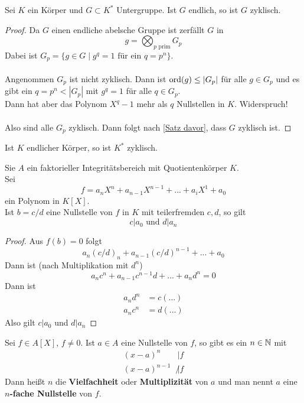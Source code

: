 	\begin{theorem}
		Sei $K$ ein Körper und $G\subset K^*$ Untergruppe. Ist $G$ endlich, so ist $G$ zyklisch.
	\end{theorem}
	\begin{proof}
		Da $G$ einen endliche abelsche Gruppe ist zerfällt $G$ in
		\[g=\bigotimes_{\text{$p$ prim}}G_p\]
		Dabei ist $G_p=\{g\in G\mid \text{$g^q=1$ für ein $q=p^n$}\}$.\\
		\\
		Angenommen $G_p$ ist nicht zyklisch. Dann ist $\operatorname{ord}(g)\leq |G_p|$ für alle $g\in G_p$ und es gibt ein $q=p^n<|G_p|$ mit $g^q=1$ für alle $q\in G_p$.\\
		Dann hat aber das Polynom $X^q-1$ mehr als $q$ Nullstellen in $K$. Widerspruch!\\
		\\
		Also sind alle $G_p$ zyklisch. Dann folgt nach \ref{Satz davor}, dass $G$ zyklisch ist.
	\end{proof}

	\begin{kor}
		Ist $K$ endlicher Körper, so ist $K^*$ zyklisch.
	\end{kor}

	\begin{satz}
		Sie $A$ ein faktorieller Integritätsbereich mit Quotientenkörper $K$.\\
		Sei
		\[f=a_nX^n+a_{n-1}X^{n-1}+...+a_iX^1+a_0\]
		ein Polynom in $K[X]$.\\
		Ist $b=c/d$ eine Nullstelle von $f$ in $K$ mit teilerfremden $c,d$, so gilt
		\[\text{$c|a_0$ und $d|a_n$}\]
	\end{satz}
	\begin{proof}
		Aus $f(b)=0$ folgt\[a_n\left(c/d\right)_{n}+a_{n-1}(c/d)^{n-1}+...+a_0\]
		Dann ist (nach Multiplikation mit $d^n$)
		\[a_nc^n+a_{n-1}c^{n-1}d+...+a_nd^n=0\]
		Dann ist
		\begin{align*}
		a_nd^n&=c(...)\\
		a_nc^n&=d(...)
		\end{align*}
		Also gilt $c|a_0$ und $d|a_n$
	\end{proof}

	\begin{definition}
		Sei $f\in A[X]$, $f\neq 0$. Ist $a\in A$ eine Nullstelle von $f$, so gibt es ein $n\in\mathbb{N}$ mit
		\begin{align*}
		(x-a)^n&|f\\
		(x-a)^{n-1}&\not |f
		\end{align*} 
		Dann heißt $n$ die \textbf{Vielfachheit} oder \textbf{Multiplizität} von $a$ und man nennt $a$ eine \textbf{$n$-fache Nullstelle} von $f$.
	\end{definition}

